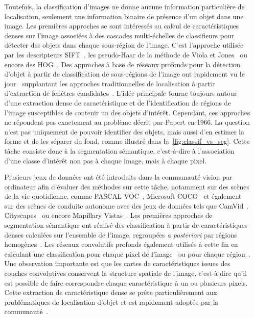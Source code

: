 Toutefois, la classification d'images ne donne aucune information particulière de localisation, seulement une information binaire de présence d'un objet dans une image. Les premières approches se sont intéressés au calcul de caractéristiques denses sur l'image associées à des cascades multi-échelles de classifieurs pour détecter des objets dans chaque sous-région de l'image. C'est l'approche utilisée par les descripteurs \gls{SIFT}~\cite{lowe_object_1999}, les pseudo-Haar de la méthode de Viola et Jones~\cite{viola_robust_2001} ou encore des \gls{HOG}~\cite{dalal_histograms_2005}. Des approches à base de réseaux profonds pour la détection d'objet à partir de classification de sous-régions de l'image ont rapidement vu le jour~\cite{girshick_rich_2014,liu_ssd_2016,girshick_region-based_2016} supplantant les approches traditionnelles de localisation à partir d'extraction de fenêtres candidates~\cite{gu_recognition_2009,uijlings_selective_2013}. L'idée principale tourne toujours autour d'une extraction dense de caractéristique et de l'identification de régions de l'image susceptibles de contenir un des objets d'intérêt. Cependant, ces approches ne répondent pas exactement au problème décrit par Papert en 1966. La question n'est pas uniquement de pouvoir identifier des objets, mais aussi d'en estimer la forme et de les séparer du fond, comme illustré dans la~\cref{fig:classif_vs_seg}. Cette tâche consiste donc à la segmentation sémantique, c'est-à-dire à l'association d'une classe d'intérêt non pas à chaque image, mais à chaque pixel.

Plusieurs jeux de données ont été introduits dans la communauté vision par ordinateur afin d'évaluer des méthodes sur cette tâche, notamment sur des scènes de la vie quotidienne, comme PASCAL VOC~\cite{everingham_pascal_2014}, Microsoft COCO~\cite{lin_microsoft_2014} et également sur des scènes de conduite autonome avec des jeux de données tels que CamVid~\cite{brostow_semantic_2009}, Cityscapes~\cite{cordts_cityscapes_2016} ou encore Mapillary Vistas~\cite{neuhold_mapillary_2017}. Les premières approches de segmentation sémantique ont réalisé des classification à partir de caractéristiques denses calculées sur l'ensemble de l'image, regroupées \emph{a posteriori} par régions homogènes~\cite{shotton_semantic_2008,shotton_real-time_2011}. Les réseaux convolutifs profonds également utilisés à cette fin en calculant une classification pour chaque pixel de l'image~\cite{grangier_deep_2009,ciresan_deep_2012} ou pour chaque région~\cite{farabet_towards_2013,sermanet_overfeat_2013}. Une observation importante est que les cartes de caractéristiques issues des couches convolutives conservent la structure spatiale de l'image, c'est-à-dire qu'il est possible de faire correspondre chaque caractéristique à un ou plusieurs pixels. Cette extraction de caractéristique dense se prête particulièrement aux problématiques de localisation d'objet et est rapidement adoptée par la communauté~\cite{zou_generic_2014}.

